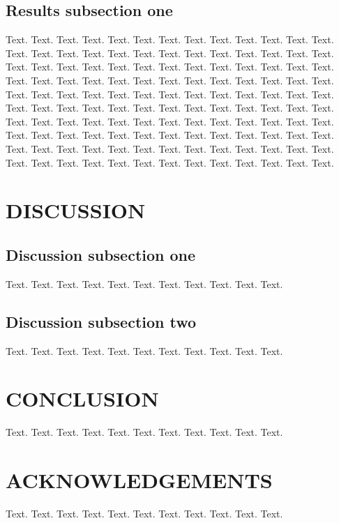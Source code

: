 \documentclass[a4,center,fleqn]{NAR}
\begin{document}
\subsection{Results subsection one}

Text. Text. Text. Text. Text. Text. Text. Text. Text. Text. Text.
Text. Text. Text. Text. Text. Text. Text. Text. Text. Text. Text.
Text. Text. Text. Text. Text. Text. Text. Text. Text. Text. Text.
Text. Text. Text. Text. Text. Text. Text. Text. Text. Text. Text.
Text. Text. Text. Text. Text. Text. Text. Text. Text. Text. Text.
Text. Text. Text. Text. Text. Text. Text. Text. Text. Text. Text.
Text. Text. Text. Text. Text. Text. Text. Text. Text. Text. Text.
Text. Text. Text. Text. Text. Text. Text. Text. Text. Text. Text.
Text. Text. Text. Text. Text. Text. Text. Text. Text. Text. Text.
Text. Text. Text. Text. Text. Text. Text. Text. Text. Text. Text.
Text. Text. Text. Text. Text. Text. Text. Text. Text. Text. Text.
Text. Text. Text. Text. Text. Text. Text. Text. Text.

\section{DISCUSSION}

\subsection{Discussion subsection one}

Text. Text. Text. Text. Text. Text. Text. Text. Text. Text. Text.

\subsection{Discussion subsection two}

Text. Text. Text. Text. Text. Text. Text. Text. Text. Text. Text.

\section{CONCLUSION}

Text. Text. Text. Text. Text. Text. Text. Text. Text. Text. Text.

\section{ACKNOWLEDGEMENTS}

Text. Text. Text. Text. Text. Text. Text. Text. Text. Text. Text.
\end{document}
